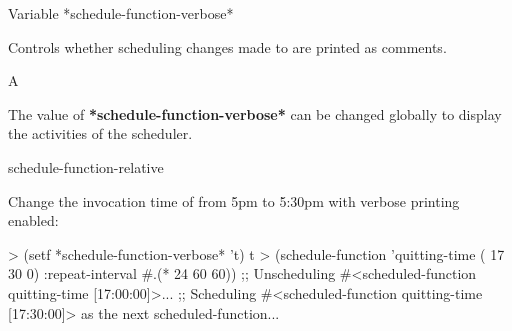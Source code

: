 \begin{functiondoc}{Variable}%
  {*schedule-function-verbose*}{}%

\fnsyntax

\fnpurpose Controls whether scheduling changes made to
 are printed as comments. 

\fnpackage {}

\fnmodule {}

\fnvaluetype A 

\fninitialvalue \nil

\fndescription The value of \textbf{*schedule-function-verbose*} can be
changed globally to display the activities of the 
scheduler.

\begin{alsos}{schedule-function-relative}
\end{alsos}

%
\fnexample 
Change the invocation time of  
from 5pm to 5:30pm with verbose printing enabled:
%
\W\supp
\begin{example}
> (setf *schedule-function-verbose* 't)
t
> (schedule-function 'quitting-time ( 17 30 0)
    :repeat-interval #.(* 24 60 60))
;; Unscheduling #<scheduled-function quitting-time [17:00:00]>...
;; Scheduling #<scheduled-function quitting-time [17:30:00]> 
   as the next scheduled-function...
\end{example}

\end{functiondoc}


